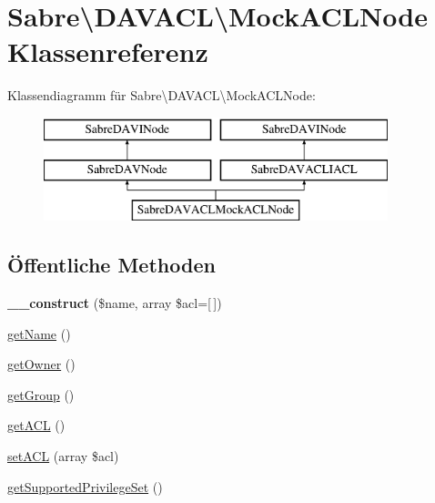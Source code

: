 \hypertarget{class_sabre_1_1_d_a_v_a_c_l_1_1_mock_a_c_l_node}{}\section{Sabre\textbackslash{}D\+A\+V\+A\+CL\textbackslash{}Mock\+A\+C\+L\+Node Klassenreferenz}
\label{class_sabre_1_1_d_a_v_a_c_l_1_1_mock_a_c_l_node}
Klassendiagramm für Sabre\textbackslash{}D\+A\+V\+A\+CL\textbackslash{}Mock\+A\+C\+L\+Node\+:\begin{figure}[H]
\begin{center}
\leavevmode
\includegraphics[height=3.000000cm]{class_sabre_1_1_d_a_v_a_c_l_1_1_mock_a_c_l_node}
\end{center}
\end{figure}
\subsection*{Öffentliche Methoden}
\begin{DoxyCompactItemize}
\item 
\mbox{\label{class_sabre_1_1_d_a_v_a_c_l_1_1_mock_a_c_l_node_afdbbf540850fc022ae00a2239200f5ae}} 
{\bfseries \+\_\+\+\_\+construct} (\$name, array \$acl=\mbox{[}$\,$\mbox{]})
\item 
\mbox{\hyperlink{class_sabre_1_1_d_a_v_a_c_l_1_1_mock_a_c_l_node_accfb75d9c0a586cdb2501e323c6b0f02}{get\+Name}} ()
\item 
\mbox{\hyperlink{class_sabre_1_1_d_a_v_a_c_l_1_1_mock_a_c_l_node_a24283bdd3d5c45d8aeae2fba3324fefa}{get\+Owner}} ()
\item 
\mbox{\hyperlink{class_sabre_1_1_d_a_v_a_c_l_1_1_mock_a_c_l_node_af63c8a7655e4bb7eb9770369619af403}{get\+Group}} ()
\item 
\mbox{\hyperlink{class_sabre_1_1_d_a_v_a_c_l_1_1_mock_a_c_l_node_a2c9847639e9c69f53d39a8d71d704ab6}{get\+A\+CL}} ()
\item 
\mbox{\hyperlink{class_sabre_1_1_d_a_v_a_c_l_1_1_mock_a_c_l_node_a97023e609682d3ed8b6df9ef6d2004eb}{set\+A\+CL}} (array \$acl)
\item 
\mbox{\hyperlink{class_sabre_1_1_d_a_v_a_c_l_1_1_mock_a_c_l_node_a9fe13e6c41773c26427f9b1ab46b3c8f}{get\+Supported\+Privilege\+Set}} ()
\end{DoxyCompactItemize}
